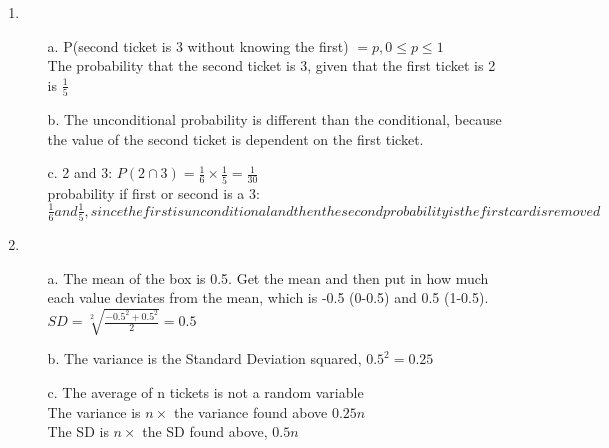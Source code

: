 \documentclass[12pt]{article}
\begin{document}
\begin{enumerate}
\begin{enumerate}
        \end{enumerate}


    \item
        \begin{enumerate}

        \item [a.] P(second ticket is 3 without knowing the first) $ = p, 0\leq p \leq 1  $
        \\ The probability that the second ticket is 3, given that the first ticket is 2 is $\frac{1}{5}$
        \item [b.] The unconditional probability is different than the conditional, because the value of the second ticket is dependent on the first ticket.
        \item [c.] 2 and 3: $ P(2 \cap 3) = \frac{1}{6} \times \frac{1}{5} = \frac{1}{30} $
        \\ probability if first or second is a 3:
        $ \frac{1}{6} and \frac{1}{5}, since the first is unconditional and then the second probability is the first card is removed  $

        \end{enumerate}

    \item
        \begin{enumerate}
            \item [a.]
            The mean of the box is 0.5. Get the mean and then put in how much each value deviates from the mean, which is -0.5 (0-0.5) and 0.5 (1-0.5). \\
            $ SD = \sqrt[2] { \frac{-0.5^{2} + 0.5^{2}  }{2} } = 0.5$
            \item [b.]
            The variance is the Standard Deviation squared, $ 0.5^{2} = 0.25$
            \item [c.]
            The average of n tickets is not a random variable \\
            The variance is $ n \times$ the variance found above $0.25\textit{n} $ \\
            The SD is $ n \times$ the SD found above, $0.5\textit{n}$
        \end{enumerate}


\end{enumerate}
\end{document}
